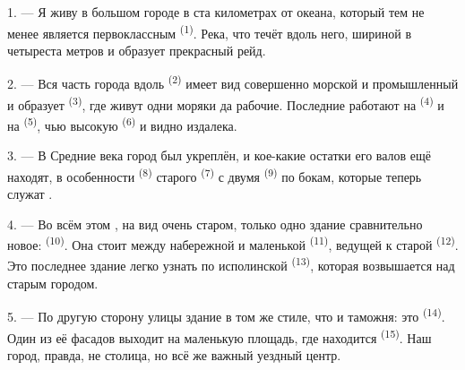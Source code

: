 
\VUsaut{2.0mm}
\VUsaut{3.0mm}
\VUfilet{16mm}
\VUsaut{5.6mm}
\VUsaut{1.4mm}
\VUsaut{2.2mm}

\VUsaut{3.0mm}

1. --- Я живу в большом городе в ста километрах от океана, который тем не
менее является первоклассным  \textsuperscript{(1)}. Река, что течёт
вдоль него, шириной в четыреста метров и образует прекрасный рейд.

2. --- Вся часть города вдоль  \textsuperscript{(2)} имеет вид
совершенно морской и промышленный и образует 
\textsuperscript{(3)}, где живут одни моряки да рабочие. Последние работают на
 \textsuperscript{(4)} и на  \textsuperscript{(5)},
чью высокую  \textsuperscript{(6)} и  видно
издалека.

3. --- В Средние века город был укреплён, и кое-какие остатки его валов
ещё находят, в особенности  \textsuperscript{(8)} старого
 \textsuperscript{(7)} с двумя 
\textsuperscript{(9)} по бокам, которые теперь служат .

4. --- Во всём этом , на вид очень старом, только одно
здание сравнительно новое:  \textsuperscript{(10)}. Она стоит
между набережной и маленькой  \textsuperscript{(11)}, ведущей к
старой  \textsuperscript{(12)}. Это последнее здание легко узнать
по исполинской  \textsuperscript{(13)}, которая возвышается
над старым городом.

5. --- По другую сторону улицы  здание в том же стиле, что и
таможня: это  \textsuperscript{(14)}. Один из её фасадов выходит на
маленькую площадь, где находится  \textsuperscript{(15)}. Наш
город, правда, не столица, но всё же важный уездный центр.

